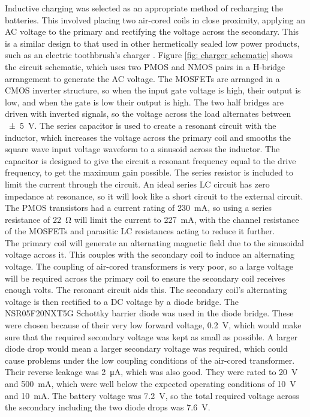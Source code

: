 Inductive charging was selected as an appropriate method of recharging the batteries. This involved placing two air-cored coils in close proximity, applying an AC voltage to the primary and rectifying the voltage across the secondary. This is a similar design to that used in other hermetically sealed low power products, such as an electric toothbrush's charger \cite{wireless_power_review}. Figure \ref{fig: charger schematic} shows the circuit schematic, which uses two PMOS and NMOS pairs in a H-bridge arrangement to generate the AC voltage. The MOSFETs are arranged in a CMOS inverter structure, so when the input gate voltage is high, their output is low, and when the gate is low their output is high. The two half bridges are driven with inverted signals, so the voltage across the load alternates between \SI{\pm 5}{\volt}. The series capacitor is used to create a resonant circuit with the inductor, which increases the voltage across the primary coil and smooths the square wave input voltage waveform to a sinusoid across the inductor. The capacitor is designed to give the circuit a resonant frequency equal to the drive frequency, to get the maximum gain possible. The series resistor is included to limit the current through the circuit. An ideal series LC circuit has zero impedance at resonance, so it will look like a short circuit to the external circuit. The PMOS transistors had a current rating of \SI{230}{\milli\ampere}, so using a series resistance of \SI{22}{\ohm} will limit the current to \SI{227}{\milli\ampere}, with the channel resistance of the MOSFETs and parasitic LC resistances acting to reduce it further.\\

The primary coil will generate an alternating magnetic field due to the sinusoidal voltage across it. This couples with the secondary coil to induce an alternating voltage. The coupling of air-cored transformers is very poor, so a large voltage will be required across the primary coil to ensure the secondary coil receives enough volts. The resonant circuit aids this. The secondary coil's alternating voltage is then rectified to a DC voltage by a diode bridge. The NSR05F20NXT5G Schottky barrier diode \cite{original_diode} was used in the diode bridge. These were chosen because of their very low forward voltage, \SI{0.2}{\volt}, which would make sure that the required secondary voltage was kept as small as possible. A larger diode drop would mean a larger secondary voltage was required, which could cause problems under the low coupling conditions of the air-cored transformer. Their reverse leakage was \SI{2}{\micro\ampere}, which was also good. They were rated to \SI{20}{\volt} and \SI{500}{\milli\ampere}, which were well below the expected operating conditions of \SI{10}{\volt} and \SI{10}{\milli\ampere}. The battery voltage was \SI{7.2}{\volt}, so the total required voltage across the secondary including the two diode drops was \SI{7.6}{\volt}.\\

